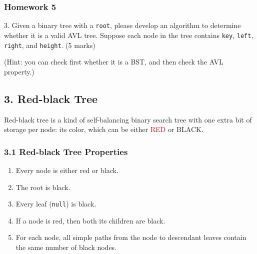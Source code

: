 \documentclass[aspectratio=169, 14pt]{beamer}
\begin{document}
\begin{frame}
    \frametitle{Homework 5}
3. Given a binary tree with a \texttt{root}, please develop an algorithm to determine whether it is a valid AVL tree. Suppose each node in the tree contains \texttt{key}, \texttt{left}, \texttt{right}, and \texttt{height}. (5 marks)

(\small{Hint: you can check first whether it is a BST, and then check the AVL property.})

\end{frame}

\begin{frame}

    \section{\textcolor{darkmidnightblue}{3. Red-black Tree}} 
    Red-black tree is a kind of self-balancing binary search tree with one extra bit of storage per node: its color, which can be either \textcolor{red}{RED} or BLACK. 
\end{frame}

\begin{frame}[fragile]
    \frametitle{3.1 Red-black Tree Properties}
\begin{enumerate}
    \item Every node is either red or black.
    \item The root is black.
    \item Every leaf (\texttt{null}) is black.
    \item If a node is red, then both its children are black.
    \item For each node, all simple paths from the node to descendant leaves contain the same number of black nodes.
\end{enumerate}

\end{frame}
\end{document}
